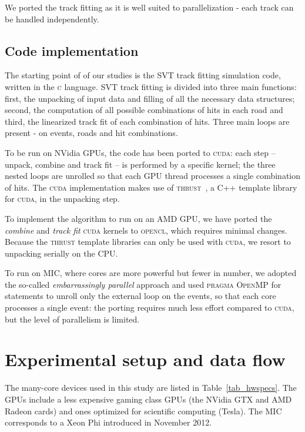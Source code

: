 \documentclass[journal]{IEEEtran}
\begin{document}
We ported the track fitting as it is well suited to parallelization -
each track can be handled independently.

\subsection{Code implementation}
The starting point of of our studies is the SVT track fitting
simulation code, written in the \textsc{c} language. SVT track fitting
is divided into three main functions: first, the unpacking of input
data and filling of all the necessary data structures; second, the
computation of all possible combinations of hits in each road and
third, the linearized track fit of each combination of hits. Three
main loops are present - on events, roads and hit combinations.

To be run on NVidia GPUs, the code has been ported to \textsc{cuda}: each step --
unpack, combine and track fit -- is performed by a specific kernel; the
three nested loops are unrolled so that each GPU thread processes a
single combination of hits.  The \textsc{cuda} implementation makes use of 
\textsc{thrust}~\cite{bib_thrust}, a C++ template library for \textsc{cuda}, in the unpacking step.

To implement the algorithm to run on an AMD GPU, we have ported the \textit{combine} and \textit{track fit}
\textsc{cuda} kernels to \textsc{opencl}, which requires minimal changes. Because the \textsc{thrust} template libraries
can only be used with \textsc{cuda}, we resort to unpacking serially on the CPU.

To run on MIC, where cores are more powerful 
but fewer in number, we adopted the so-called
\textit{embarrassingly parallel} approach and used \textsc{pragma
  OpenMP} for statements to unroll only the external loop on the events, so
that each core processes a single event: the porting requires much
less effort compared to \textsc{cuda}, but the level of parallelism is
limited.

\section{Experimental setup and data flow}
The many-core devices used in this study are listed in
Table~\ref{tab_hwspecs}. The GPUs include a less expensive gaming
class GPUs (the NVidia GTX and AMD Radeon cards) and ones optimized for scientific computing
(Tesla). The MIC corresponds to a Xeon Phi introduced in November 2012.
\end{document}
